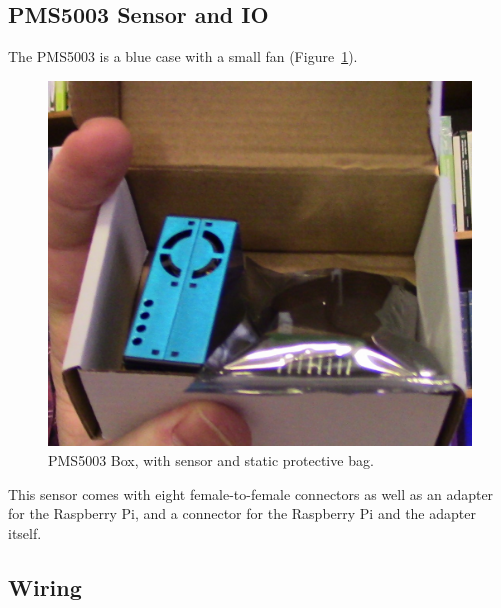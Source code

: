 \documentclass{article}
\begin{document}
\subsection{PMS5003 Sensor and IO}

The PMS5003 is a blue case with a small fan (Figure~\ref{fig:PMS5003box}).

\begin{figure}
\includegraphics[width=1.00\textwidth]{images/2_PMS5003_box.JPG}
\caption{PMS5003 Box, with sensor and static protective bag.}
\label{fig:PMS5003box}
\end{figure}

This sensor comes with eight female-to-female connectors as well as an adapter for the Raspberry Pi, and a connector for the Raspberry Pi and the adapter itself.  

\subsection{Wiring}
\end{document}

